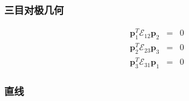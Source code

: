 \documentclass{beamer}
\newcommand{\tmmathbf}[1]{\ensuremath{\boldsymbol{#1}}}
\begin{document}
{{\begin{frame}
  {\hspace{4em}}
\end{frame}}{\begin{frame}
  \frametitle{三目对极几何}
  \begin{eqnarray*}
    \tmmathbf{p}^T_1 \mathcal{E}_{12} \tmmathbf{p}_2 & = & 0\\
    \tmmathbf{p}^T_2 \mathcal{E}_{23} \tmmathbf{p}_3 & = & 0\\
    \tmmathbf{p}^T_3 \mathcal{E}_{31} \tmmathbf{p}_1 & = & 0
  \end{eqnarray*}
\end{frame}}{\begin{frame}
  \frametitle{直线}
  

\end{frame}}}
\end{document}
